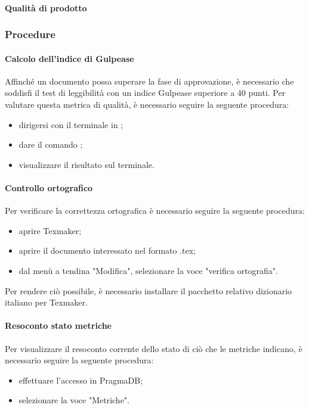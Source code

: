 \paragraph{Qualità di prodotto}
\subsubsection{Procedure}

\paragraph{Calcolo dell'indice di Gulpease}
Affinché un documento possa superare la fase di approvazione, è necessario che soddisfi il test di
leggibilità con un indice Gulpease superiore a 40 punti. Per valutare questa metrica di qualità, è necessario seguire la seguente procedura:
\begin{itemize}
	\item dirigersi con il terminale in \GulScript;
	\item dare il comando ;
    \item visualizzare il risultato sul terminale.
\end{itemize}
\paragraph{Controllo ortografico}
Per verificare la correttezza ortografica è necessario seguire la seguente procedura:
\begin{itemize}
	\item aprire Texmaker;
	\item aprire il documento interessato nel formato .tex;
	\item dal menù a tendina "Modifica", selezionare la voce "verifica ortografia".
\end{itemize}
Per rendere ciò possibile, è necessario installare il pacchetto relativo dizionario italiano per Texmaker.
\paragraph{Resoconto stato metriche}
Per visualizzare il resoconto corrente dello stato di ciò che le metriche indicano, è necessario seguire la seguente procedura:
\begin{itemize}
	\item effettuare l'accesso in PragmaDB;
	\item selezionare la voce "Metriche".
\end{itemize}
